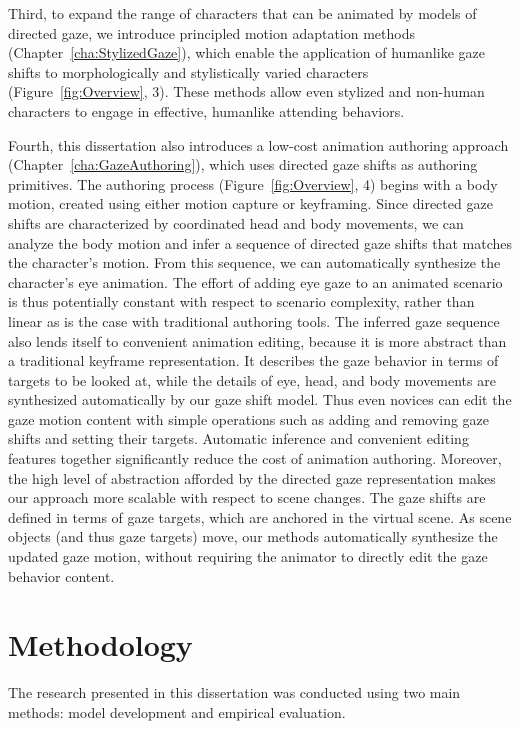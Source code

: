 Third, to expand the range of characters that can be animated by models of directed gaze, we introduce principled motion adaptation methods (Chapter~\ref{cha:StylizedGaze}), which enable the application of humanlike gaze shifts to morphologically and stylistically varied characters (Figure~\ref{fig:Overview}, 3). These methods allow even stylized and non-human characters to engage in effective, humanlike attending behaviors.

Fourth, this dissertation also introduces a low-cost animation authoring approach (Chapter~\ref{cha:GazeAuthoring}), which uses directed gaze shifts as authoring primitives.
The authoring process (Figure~\ref{fig:Overview}, 4) begins with a body motion, created using either motion capture or keyframing. Since directed gaze shifts are characterized by coordinated head and body movements, we can analyze the body motion and infer a sequence of directed gaze shifts that matches the character's motion.
From this sequence, we can automatically synthesize the character's eye animation. The effort of adding eye gaze to an animated scenario is thus potentially constant with respect to scenario complexity, rather than linear as is the case with traditional authoring tools.
The inferred gaze sequence also lends itself to convenient animation editing, because it is more abstract than a traditional keyframe representation. It describes the gaze behavior in terms of targets to be looked at, while the details of eye, head, and body movements are synthesized automatically by our gaze shift model. Thus even novices can edit the gaze motion content with simple operations such as adding and removing gaze shifts and setting their targets.
Automatic inference and convenient editing features together significantly reduce the cost of animation authoring.
Moreover, the high level of abstraction afforded by the directed gaze representation makes our approach more scalable with respect to scene changes. The gaze shifts are defined in terms of gaze targets, which are anchored in the virtual scene. As scene objects (and thus gaze targets) move, our methods automatically synthesize the updated gaze motion, without requiring the animator to directly edit the gaze behavior content.

\section{Methodology}

The research presented in this dissertation was conducted using two main methods: model development and empirical evaluation.


